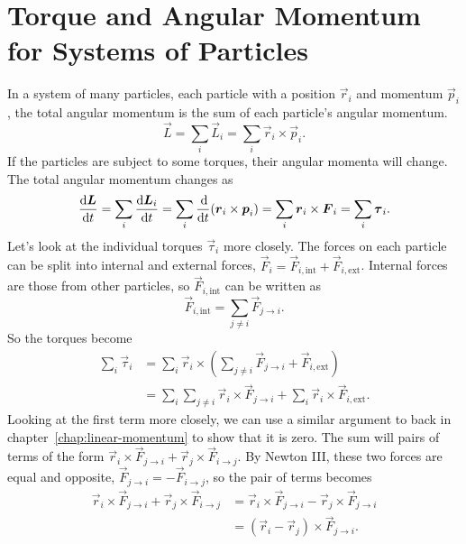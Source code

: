 \documentclass[../classical_mechanics.tex]{subfiles}
\begin{document}
    \section{Torque and Angular Momentum for Systems of Particles}\label{sec:torque-and-angular-momentum-for-systems-of-particles}
        In a system of many particles, each particle with a position $\vec{r}_i$ and momentum $\vec{p}_i$, the total angular momentum is the sum of each particle's angular momentum.
        \begin{equation}
            \vec{L}=\sum_i\vec{L}_i=\sum_i\vec{r}_i\times\vec{p}_i.
        \end{equation}
        If the particles are subject to some torques, their angular momenta will change.
        The total angular momentum changes as
        \begin{equation}
            \dv{\vec{L}}{t}=\sum_i\dv{\vec{L}_i}{t}=\sum_i\dv{}{t}(\vec{r}_i\times\vec{p}_i)=\sum_i\vec{r}_i\times\vec{F}_i=\sum_i\vec{\tau}_i.
        \end{equation}
        Let's look at the individual torques $\vec{\tau}_i$ more closely.
        The forces on each particle can be split into internal and external forces, $\vec{F}_i=\vec{F}_{i,\text{int}}+\vec{F}_{i,\text{ext}}$.
        Internal forces are those from other particles, so $\vec{F}_{i,\text{int}}$ can be written as
        \begin{equation}
            \vec{F}_{i,\text{int}}=\sum_{j\neq i}\vec{F}_{j\to i}.
        \end{equation}
        So the torques become
        \begin{align}
            \sum_i\vec{\tau}_i&=\sum_i\vec{r}_i\times\left(\sum_{j\neq i}\vec{F}_{j\to i}+\vec{F}_{i,\text{ext}}\right)\\
            &=\sum_i\sum_{j\neq i}\vec{r}_i\times\vec{F}_{j\to i}+\sum_i\vec{r}_i\times\vec{F}_{i,\text{ext}}.
        \end{align}
        Looking at the first term more closely, we can use a similar argument to back in chapter~\ref{chap:linear-momentum} to show that it is zero.
        The sum will pairs of terms of the form $\vec{r}_i\times\vec{F}_{j\to i}+\vec{r}_j\times\vec{F}_{i\to j}$.
        By Newton III, these two forces are equal and opposite, $\vec{F}_{j\to i}=-\vec{F}_{i\to j}$, so the pair of terms becomes
        \begin{align}
            \vec{r}_i\times\vec{F}_{j\to i}+\vec{r}_j\times\vec{F}_{i\to j}&=\vec{r}_i\times\vec{F}_{j\to i}-\vec{r}_j\times\vec{F}_{j\to i}\\
            &=(\vec{r}_i-\vec{r}_j)\times\vec{F}_{j\to i}.
        \end{align}
\end{document}
